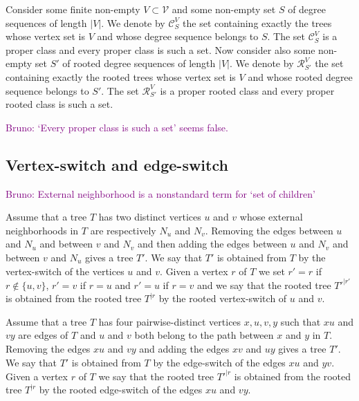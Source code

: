 \documentclass[11 pt]{modarticle}
\newcommand{\vset}{\mathcal{V}}
\newcommand{\size}[1]{|#1|}
\newcommand{\rtree}[2]{{#1}^{\lvert #2}}
\newcommand{\tclass}{\mathcal{C}}
\newcommand{\rtclass}{\mathcal{R}}
\newcommand{\pclass}[2]{\tclass^{#1}_{#2}}
\newcommand{\rpclass}[2]{\rtclass^{#1}_{#2}}
\newcommand{\bldcomment}[1]{\textcolor{purple}{{\footnotesize Bruno:} #1}}
\begin{document}
Consider some finite non-empty $V \subset \vset$ and some non-empty set $S$ of degree sequences of length $\size{V}$. We denote by $\pclass{V}{S}$ the set containing exactly the trees whose vertex set is $V$ and whose degree sequence belongs to $S$. The set $\pclass{V}{S}$ is a proper class and every proper class is such a set. Now consider also some non-empty set $S'$ of rooted degree sequences of length $\size{V}$. We denote by $\rpclass{V}{S'}$ the set containing exactly the rooted trees whose vertex set is $V$ and whose rooted degree sequence belongs to $S'$. The set $\rpclass{V}{S'}$ is a proper rooted class and every proper rooted class is such a set.

\bldcomment{`Every proper class is such a set' seems false.}

\subsection{Vertex-switch and edge-switch}

\bldcomment{External neighborhood is a nonstandard term for `set of children'}
\begin{defi}
Assume that a tree $T$ has two distinct vertices $u$ and $v$ whose external neighborhoods in $T$ are respectively $N_u$ and $N_v$. Removing the edges between $u$ and $N_u$ and between $v$ and $N_v$ and then adding the edges between $u$ and $N_v$ and between $v$ and $N_u$ gives a tree $T'$. We say that $T'$ is obtained from $T$ by the vertex-switch of the vertices $u$ and $v$. Given a vertex $r$ of $T$ we set $r' = r$ if $r \notin \{u,v\}$, $r' = v$ if $r = u$ and $r' = u$ if $r = v$ and we say that the rooted tree $\rtree{T'}{r'}$ is obtained from the rooted tree $\rtree{T}{r}$ by the rooted vertex-switch of $u$ and $v$.
\end{defi}

\begin{defi}
Assume that a tree $T$ has four pairwise-distinct vertices $x,u,v,y$ such that $xu$ and $vy$ are edges of $T$ and $u$ and $v$ both belong to the path between $x$ and $y$ in $T$. Removing the edges $xu$ and $vy$ and adding the edges $xv$ and $uy$ gives a tree $T'$. We say that $T'$ is obtained from $T$ by the edge-switch of the edges $xu$ and $yv$. Given a vertex $r$ of $T$ we say that the rooted tree $\rtree{T'}{r}$ is obtained from the rooted tree $\rtree{T}{r}$ by the rooted edge-switch of the edges $xu$ and $vy$.
\end{defi}
\end{document}
